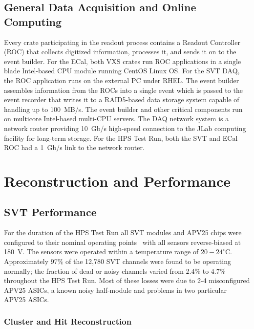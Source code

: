 \documentclass[final,3p,times,twocolumn]{elsarticle}
\begin{document}
\subsection{General Data Acquisition and Online Computing}
\label{sec:daq}
Every crate participating in the readout process contains a Readout Controller (ROC) that 
collects digitized information, processes it, and sends it on to the event builder. For the ECal, both 
VXS crates run ROC applications in a single blade Intel-based CPU module running CentOS 
Linux OS. For the SVT DAQ, the ROC application runs on the external PC under RHEL. 
The event builder assembles information from the ROCs into a single event which is passed to the 
event recorder that writes it to a RAID5-based data storage system capable of handling up to 
100~MB/s. The event builder and other critical components run on multicore Intel-based multi-CPU 
servers. The DAQ network system is a network router providing 10~Gb/s high-speed connection 
to the JLab computing facility for long-term storage. For the HPS Test Run, both the SVT and ECal ROC had 
a 1~Gb/s link to the network router.






\section{Reconstruction and Performance}

\subsection{SVT Performance}

For the duration of the HPS Test Run all SVT modules and APV25 chips were configured to their 
nominal operating points~\cite{Jones:1069892} with all sensors reverse-biased at 180~V.  The 
sensors were operated within a temperature range of  $20-24^\circ$C.
Approximately 97\% of the 12,780 SVT channels were found to
be operating normally;  the fraction of dead or noisy channels varied from 2.4\% to 4.7\% throughout 
the HPS Test Run. Most of these losses were due to 2-4 misconfigured APV25 ASICs, a known noisy 
half-module and problems in two particular APV25 ASICs. 


\subsubsection{Cluster and Hit Reconstruction}
\end{document}
